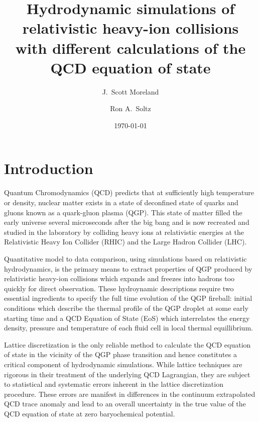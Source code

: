 \documentclass[aps,prc,reprint,amsmath,nofootinbib,superscriptaddress]{revtex4-1}
\begin{document}
\title{Hydrodynamic simulations of relativistic heavy-ion collisions\\ with different calculations of the QCD equation of state}

\author{J.\ Scott Moreland}
\author{Ron A.\ Soltz}

\date{\today}

\begin{abstract} 
   
\end{abstract}

\maketitle

\section{Introduction}

Quantum Chromodynamics (QCD) predicts that at sufficiently high temperature or density, nuclear matter exists in a state of deconfined state of quarks and gluons known as a quark-gluon plasma (QGP). 
This state of matter filled the early universe several microseconds after the big bang and is now recreated and studied in the laboratory by colliding heavy ions at relativistic energies at the Relativistic Heavy Ion Collider (RHIC) and the Large Hadron Collider (LHC).

Quantitative model to data comparison, using simulations based on relativistic hydrodynamics, is the primary means to extract properties of QGP produced by relativistic heavy-ion collisions which expands and freezes into hadrons too quickly for direct observation. 
These hydroynamic descriptions require two essential ingredients to specify the full time evolution of the QGP fireball: initial conditions which describe the thermal profile of the QGP droplet at some early starting time and a QCD Equation of State (EoS) which interrelates the energy density, pressure and temperature of each fluid cell in local thermal equillibrium.

Lattice discretization is the only reliable method to calculate the QCD equation of state in the vicinity of the QGP phase transition and hence constitutes a critical component of hydrodynamic simulations. 
While lattice techniques are rigorous in their treatment of the underlying QCD Lagrangian, they are subject to statistical and systematic errors inherent in the lattice discretization procedure. 
These errors are manifest in differences in the continuum extrapolated QCD trace anomaly and lead to an overall uncertainty in the true value of the QCD equation of state at zero baryochemical potential.
\end{document}
